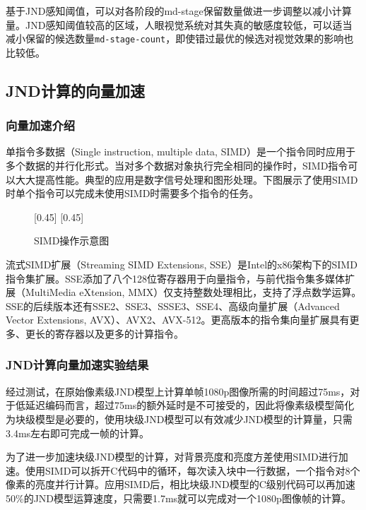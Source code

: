   基于JND感知阈值，可以对各阶段的md-stage保留数量做进一步调整以减小计算量。JND感知阈值较高的区域，人眼视觉系统对其失真的敏感度较低，可以适当减小保留的候选数量\texttt{md-stage-count}，即使错过最优的候选对视觉效果的影响也比较低。


  \subsection{JND计算的向量加速}

	\subsubsection{向量加速介绍}
	单指令多数据（Single instruction, multiple data, SIMD）是一个指令同时应用于多个数据的并行化形式。当对多个数据对象执行完全相同的操作时，SIMD指令可以大大提高性能。典型的应用是数字信号处理和图形处理。下图展示了使用SIMD时单个指令可以完成未使用SIMD时需要多个指令的任务。
	
	\begin{figure}[!hbtp]
		\centering
		[0.45\textwidth]{\resizebox{0.45\textwidth}{!}{}\label{fig:simd1}}
		 \hspace{0.7cm}
		[0.45\textwidth]{\resizebox{0.45\textwidth}{!}{}\label{fig:simd2}}
		\caption{SIMD操作示意图}
		\label{fig:simd}
	\end{figure}
	流式SIMD扩展（Streaming SIMD Extensions, SSE）是Intel的x86架构下的SIMD指令集扩展。SSE添加了八个128位寄存器用于向量指令，与前代指令集多媒体扩展（MultiMedia eXtension, MMX）仅支持整数处理相比，支持了浮点数学运算。SSE的后续版本还有SSE2、SSE3、SSSE3、SSE4、高级向量扩展（Advanced Vector Extensions, AVX）、AVX2、AVX-512。更高版本的指令集向量扩展具有更多、更长的寄存器以及更多的计算指令。
	\subsubsection{JND计算向量加速实验结果}
  经过测试，在原始像素级JND模型上计算单帧1080p图像所需的时间超过75ms，对于低延迟编码而言，超过75ms的额外延时是不可接受的，因此将像素级模型简化为块级模型是必要的，使用块级JND模型可以有效减少JND模型的计算量，只需3.4ms左右即可完成一帧的计算。
  
  为了进一步加速块级JND模型的计算，对背景亮度和亮度方差使用SIMD进行加速。使用SIMD可以拆开C代码中的循环，每次读入块中一行数据，一个指令对8个像素的亮度并行计算。应用SIMD后，相比块级JND模型的C级别代码可以再加速50\%的JND模型运算速度，只需要1.7ms就可以完成对一个1080p图像帧的计算。

